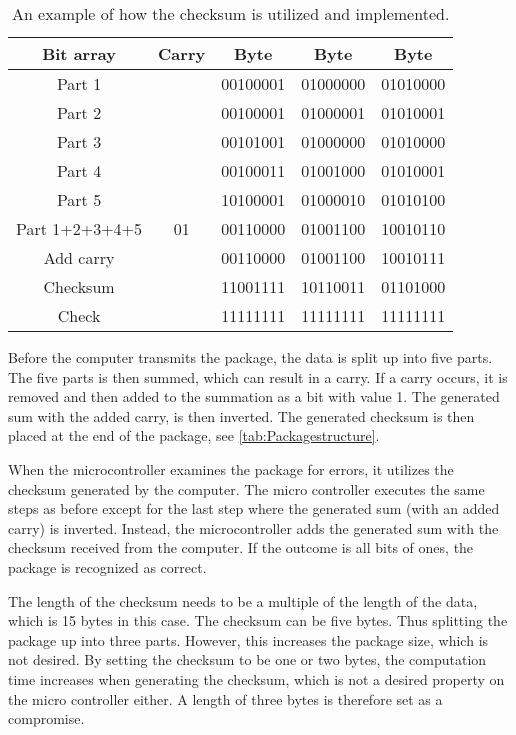 \begin{table}[H]
\centering
\begin{tabular}{|c|c|c|c|c|}
\hline
Bit array  & Carry   & Byte 	& Byte 	   & Byte		 \\ \hline
Part 1     & 		 & 00100001 & 01000000 & 01010000    \\ \hline
Part 2     & 		 & 00100001 & 01000001 & 01010001    \\ \hline
Part 3     & 		 & 00101001 & 01000000 & 01010000    \\ \hline
Part 4     & 		 & 00100011 & 01001000 & 01010001    \\ \hline
Part 5     & 		 & 10100001 & 01000010 & 01010100    \\ \hline
Part 1+2+3+4+5 & 01	 & 00110000 & 01001100 & 10010110 	 \\ \hline
Add carry  & 		 & 00110000 & 01001100 & 10010111    \\ \hline
Checksum   & 		 & 11001111 & 10110011 & 01101000    \\ \hline
Check      & 		 & 11111111 & 11111111 & 11111111    \\ \hline
\end{tabular}
\caption{An example of how the checksum is utilized and implemented.}
\label{tab:checksum}
\end{table}

Before the computer transmits the package, the data is split up into five parts. The five parts is then summed, which can result in a carry. If a carry occurs, it is removed and then added to the summation as a bit with value 1. The generated sum with the added carry, is then inverted. The generated checksum is then placed at the end of the package, see \autoref{tab:Packagestructure}.

When the microcontroller examines the package for errors, it utilizes the checksum generated by the computer. The micro controller executes the same steps as before except for the last step where the generated sum (with an added carry) is inverted. Instead, the microcontroller adds the generated sum with the checksum received from the computer. If the outcome is all bits of ones, the package is recognized as correct.

The length of the checksum needs to be a multiple of the length of the data, which is 15 bytes in this case. The checksum can be five bytes. Thus splitting the package up into three parts. However, this increases the package size, which is not desired. By setting the checksum to be one or two bytes, the computation time increases when generating the checksum, which is not a desired property on the micro controller either. A length of three bytes is therefore set as a compromise.

%
